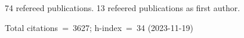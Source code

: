 74 refereed publications. 13 refeered publications as first author.

Total citations~=~3627; h-index~=~34 (2023-11-19)